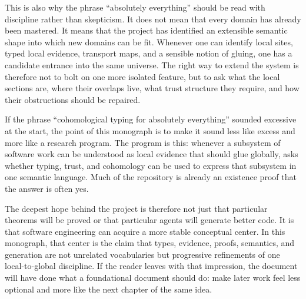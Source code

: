 This is also why the phrase ``absolutely everything'' should be read with discipline rather
than skepticism. It does not mean that every domain has already been mastered. It means that
the project has identified an extensible semantic shape into which new domains can be fit.
Whenever one can identify local sites, typed local evidence, transport maps, and a sensible
notion of gluing, one has a candidate entrance into the same universe. The right way to
extend the system is therefore not to bolt on one more isolated feature, but to ask what the
local sections are, where their overlaps live, what trust structure they require, and how
their obstructions should be repaired.

If the phrase ``cohomological typing for absolutely everything'' sounded excessive at the
start, the point of this monograph is to make it sound less like excess and more like a
research program. The program is this: whenever a subsystem of software work can be
understood as local evidence that should glue globally, \DepPy{} asks whether typing,
trust, and cohomology can be used to express that subsystem in one semantic language. Much
of the repository is already an existence proof that the answer is often yes.

The deepest hope behind the project is therefore not just that particular theorems will be
proved or that particular agents will generate better code. It is that software engineering
can acquire a more stable conceptual center. In this monograph, that center is the claim
that types, evidence, proofs, semantics, and generation are not unrelated vocabularies but
progressive refinements of one local-to-global discipline. If the reader leaves with that
impression, the document will have done what a foundational document should do: make later
work feel less optional and more like the next chapter of the same idea.
